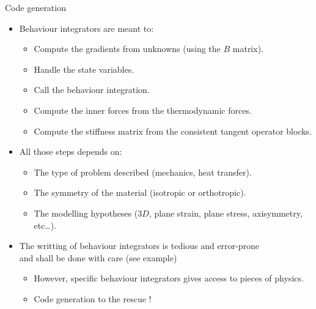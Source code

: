 \documentclass{beamer}
\providecommand{\tightlist}{%
  \setlength{\itemsep}{0pt}\setlength{\parskip}{0pt}}
\begin{document}
\begin{frame}{Code generation}
\protect\hypertarget{code-generation}{}
\begin{itemize}
\tightlist
\item
  Behaviour integrators are meant to:

  \begin{itemize}
  \tightlist
  \item
    Compute the gradients from unknowns (using the \(B\) matrix).
  \item
    Handle the state variables.
  \item
    Call the behaviour integration.
  \item
    Compute the inner forces from the thermodynamic forces.
  \item
    Compute the stiffness matrix from the consistent tangent operator
    blocks.
  \end{itemize}
\end{itemize}

\vspace*{1mm}

\begin{itemize}
\tightlist
\item
  All those steps depends on:

  \begin{itemize}
  \tightlist
  \item
    The type of problem described (mechanics, heat transfer).
  \item
    The symmetry of the material (isotropic or orthotropic).
  \item
    The modelling hypotheses (\(3D\), plane strain, plane stress,
    axisymmetry, etc\ldots).
  \end{itemize}
\end{itemize}

\vspace*{1mm}

\begin{itemize}
\tightlist
\item
  The writting of behaviour integrators is tedious and error-prone\\
  and shall be done with care (see example)

  \begin{itemize}
  \tightlist
  \item
    However, specific behaviour integrators gives access to pieces of
    physics.
  \item
    Code generation to the rescue !
  \end{itemize}
\end{itemize}
\end{frame}
\end{document}
